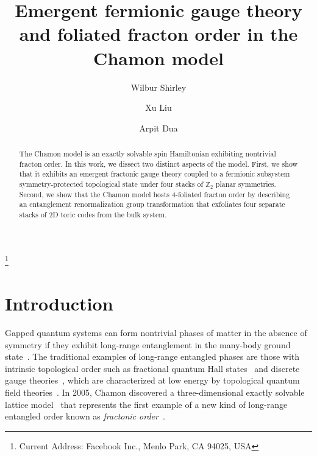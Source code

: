 \documentclass[prx,twocolumn,superscriptaddress,nofootinbib,showpacs,notitlepage]{revtex4-2}
\newcommand{\Chamon}{Chamon }
\newcommand{\arpit}[1]{{\color{ultramarine}\footnotesize{(AD) #1}}}
\begin{document}
\title{Emergent fermionic gauge theory and foliated fracton order in the Chamon model}

\author{Wilbur Shirley}
\author{Xu Liu}
\thanks{Current Address: Facebook Inc., Menlo Park, CA 94025, USA}

\author{Arpit Dua}

\begin{abstract}
    The \Chamon model is an exactly solvable spin Hamiltonian exhibiting nontrivial fracton order. In this work, we dissect two distinct aspects of the model. First, we show that it exhibits an emergent fractonic gauge theory coupled to a fermionic subsystem symmetry-protected topological state under four stacks of $\mathbb{Z}_2$ planar symmetries. Second, we show that the \Chamon model hosts 4-foliated fracton order by describing an entanglement renormalization group transformation that exfoliates four separate stacks of 2D toric codes from the bulk system.
    
\end{abstract}

\maketitle

\section{Introduction}
Gapped quantum systems can form nontrivial phases of matter in the absence of symmetry if they exhibit long-range entanglement in the many-body ground state~\cite{ChenLRE2010}. The traditional examples of long-range entangled phases are those with intrinsic topological order such as fractional quantum Hall states~\cite{Laughlin_1983,Wen_1995} and discrete gauge theories~\cite{dePropitius1999,qdouble}, which are characterized at low energy by topological quantum field theories~\cite{Witten_TQFT}. In 2005, Chamon discovered a three-dimensional exactly solvable lattice model~\cite{Chamon2005quantum} that represents the first example of a new kind of long-range entangled order known as \textit{fractonic order}~\cite{vijay_CB_2015,vijay2016fracton}. 
\end{document}
